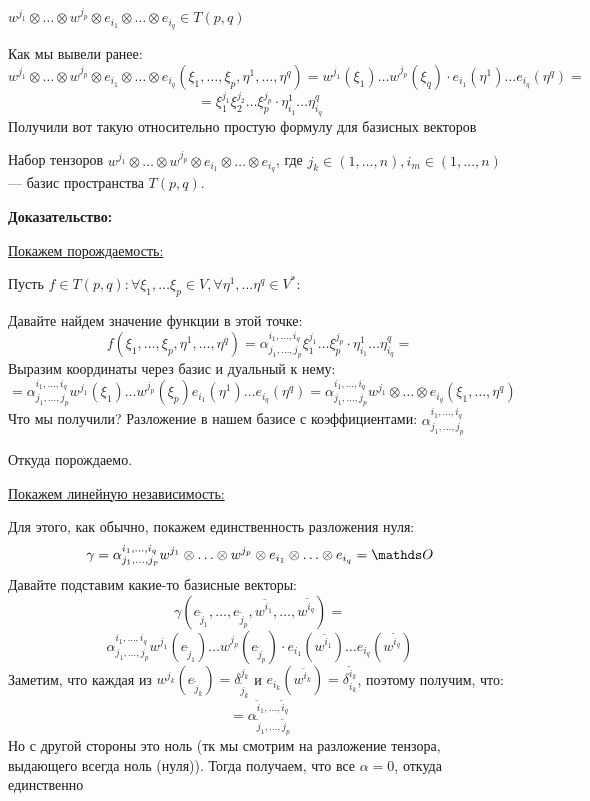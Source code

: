 $w^{j_1} \otimes \ldots \otimes w^{j_p} \otimes e_{i_1} \otimes \ldots \otimes  e_{i_q}\in T(p,q) $

Как мы вывели ранее:
$$w^{j_1}\otimes \ldots \otimes w^{j_p} \otimes e_{i_1}\otimes \ldots \otimes e_{i_q} (\xi_1,\ldots , \xi_p, \eta^1,\ldots,\eta^q) = w^{j_1}(\xi_1)\ldots w^{j_p}(\xi_q)\cdot e_{i_1}(\eta^1)\ldots e_{i_q}(\eta^q) = $$
$$=\xi_1^{j_1}\xi_2^{j_2}\ldots \xi_p^{j_p} \cdot \eta_{i_1}^1 \ldots \eta_{i_q}^q $$
Получили вот такую относительно простую формулу для базисных векторов



Набор тензоров $w^{j_1}\otimes \ldots \otimes w^{j_p} \otimes e_{i_1}\otimes \ldots \otimes e_{i_q}$, где $j_k \in (1,\ldots,n),i_m\in(1,\ldots,n)$ --- базис пространства $T(p,q)$.

\textbf{Доказательство:}


     \uline{Покажем порождаемость:}
    
    Пусть $f\in T(p,q): \forall \xi_1,\ldots \xi_p \in V, \forall \eta^1,\ldots \eta^q\in V^*:$

    Давайте найдем значение функции в этой точке:
    $$f(\xi_1,\ldots, \xi_p,\eta^1,\ldots, \eta^q) = \alpha_{j_1,\ldots,j_p}^{i_1,\ldots,i_q}\xi_1^{j_1}\ldots \xi_{p}^{j_p}\cdot \eta_{i_1}^1 \ldots \eta_{i_q}^q = $$
    Выразим координаты через базис и дуальный к нему:
    $$=\alpha_{j_1,\ldots,j_p}^{i_1,\ldots,i_q} w^{j_1}(\xi_1)\ldots w^{j_p}(\xi_p) e_{i_1}(\eta^1)\ldots e_{i_q}(\eta^q) = \alpha_{j_1,\ldots,j_p}^{i_1,\ldots,i_q} w^{j_1}\otimes \ldots \otimes e_{i_q}(\xi_1,\ldots, \eta^q)$$
    Что мы получили? Разложение в нашем базисе с коэффициентами: $\alpha_{j_1,\ldots,j_p}^{i_1,\ldots,i_q} $

    Откуда порождаемо.
    
    \uline{Покажем линейную независимость:}
    
    Для этого, как обычно, покажем единственность разложения нуля:
    $$\gamma = \alpha_{j_1,\ldots, j_p}^{i_1,\ldots,i_q}w^{j_1}\otimes\ldots\otimes w^{j_p}\otimes e_{i_1}\otimes \ldots \otimes e_{i_q}=\zero$$
    Давайте подставим какие-то базисные векторы:
    $$\gamma(e_{\widetilde{j}_1},\ldots, e_{\widetilde{j}_p}, w^{\widetilde{i}_1},\ldots, w^{\widetilde{i}_q}) = $$
    $$\alpha_{j_1,\ldots,j_p}^{i_1,\ldots,i_q}w^{j_1}(e_{\widetilde{j}_1})\ldots w^{j_p}(e_{\widetilde{j}_p}) \cdot e_{i_1}(w^{\widetilde{i}_1})\ldots e_{i_q}(w^{\widetilde{i}_q})$$
    Заметим, что каждая из $w^{j_k}(e_{\widetilde{j}_k}) = \delta_{\widetilde{j}_k}^{j_k}$ и $e_{i_k}(w^{\widetilde{i}_k}) = \delta^{\widetilde{i}_k}_{i_k}$, поэтому получим, что:
    $$ = \alpha_{\widetilde{j}_1,\ldots,\widetilde{j}_p}^{\widetilde{i}_1,\ldots, \widetilde{i}_q}$$
    Но с другой стороны это ноль (тк мы смотрим на разложение тензора, выдающего всегда ноль (нуля)). Тогда получаем, что все $\alpha = 0$, откуда единственно


